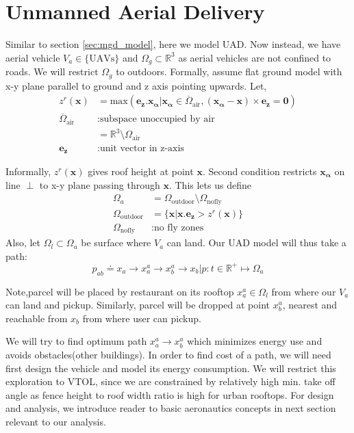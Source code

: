 \section{Unmanned Aerial Delivery}
\label{sec:uad_model}
Similar to section \ref{sec:mgd_model}, here we model UAD. Now instead, we have aerial vehicle $V_a \in \{\text{UAVs}\}$ and $\Omega_g \subset \mathbb{R}^3$ as aerial vehicles are not confined to roads. We will restrict $\Omega_g$ to outdoors. Formally,
assume flat ground model with x-y plane parallel to ground and z axis pointing upwards. Let,
\begin{align*}
    z^r(\mathbf{x}) &= \text{max} (\mathbf{e_z}.\mathbf{x_\alpha} | \mathbf{x_\alpha} \in \overline{\Omega}_{\text{air}}, (\mathbf{x_\alpha} - \mathbf{x}) \times \mathbf{e_z} = \mathbf{0} ) \\
    \overline{\Omega}_{\text{air}} &: \text{subspace unoccupied by air} \\
    &= \mathbb{R}^3 \setminus \Omega_{\text{air}} \\
    \mathbf{e_z} &: \text{unit vector in z-axis}
\end{align*}

Informally, $z^r(\mathbf{x})$ gives roof height at point $\mathbf{x}$. Second condition restricts $\mathbf{x_\alpha}$ on line $\perp$ to x-y plane passing through $\mathbf{x}$. This lets us define
\begin{align*}
    \Omega_a &= \Omega_\text{outdoor} \setminus \Omega_\text{nofly} \\
    \Omega_\text{outdoor} &= \{\mathbf{x} | \mathbf{x}.\mathbf{e_z} > z^r(\mathbf{x})\} \\
    \Omega_\text{nofly} &: \text{no fly zones}
\end{align*}
Also, let $\Omega_l \subset \Omega_a$ be surface where $V_a$ can land. Our UAD model will thus take a path:
\begin{equation*}
    p_{ab} \doteq x_a \longrightarrow x_a^a \longrightarrow x_b^a \longrightarrow x_b | p : t \in \mathbb{R}^+ \mapsto \Omega_a
\end{equation*}

Note,parcel will be placed by restaurant on its rooftop $x_a^a \in \Omega_l$ from where our $V_a$ can land and pickup. Similarly, parcel will be dropped at point $x_b^a$, nearest and reachable from $x_b$ from where user can pickup.

We will try to find optimum path $x_a^a \longrightarrow x_b^a$ which minimizes energy use and avoids obstacles(other buildings). In order to find cost of a path, we will need first design the vehicle and model its energy consumption. We will restrict this exploration to VTOL, since we are constrained by relatively high min. take off angle as fence height to roof width ratio is high for urban rooftops. For design and analysis, we introduce reader to basic aeronautics concepts in next section relevant to our analysis.